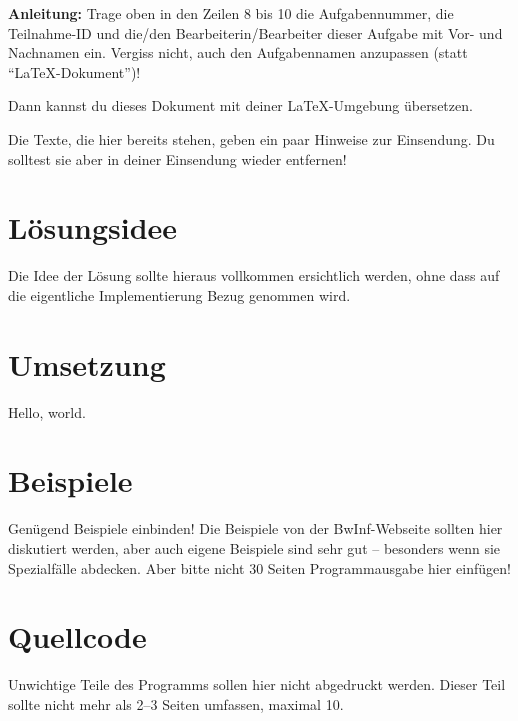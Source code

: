 \maketitle
\tableofcontents

\vspace{0.5cm}

\textbf{Anleitung:} Trage oben in den Zeilen 8 bis 10 die Aufgabennummer, die Teilnahme-ID und die/den Bearbeiterin/Bearbeiter dieser Aufgabe mit Vor- und Nachnamen ein.
Vergiss nicht, auch den Aufgabennamen anzupassen (statt "`\LaTeX-Dokument"')!

Dann kannst du dieses Dokument mit deiner \LaTeX-Umgebung übersetzen.

Die Texte, die hier bereits stehen, geben ein paar Hinweise zur Einsendung.
Du solltest sie aber in deiner Einsendung wieder entfernen!


\section{Lösungsidee}\label{sec:losungsidee}
Die Idee der Lösung sollte hieraus vollkommen ersichtlich werden, ohne dass auf die eigentliche Implementierung Bezug genommen wird.


\section{Umsetzung}\label{sec:umsetzung}
Hello\cite{Hierholzer}, world.


\section{Beispiele}\label{sec:beispiele}
Genügend Beispiele einbinden!
Die Beispiele von der BwInf-Webseite sollten hier diskutiert werden, aber auch eigene Beispiele sind
sehr gut – besonders wenn sie Spezialfälle abdecken.
Aber bitte nicht 30 Seiten Programmausgabe hier einfügen!


\section{Quellcode}\label{sec:quellcode}
Unwichtige Teile des Programms sollen hier nicht abgedruckt werden.
Dieser Teil sollte nicht mehr als 2–3 Seiten umfassen, maximal 10.

